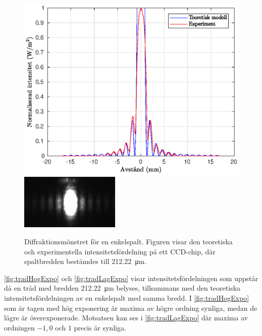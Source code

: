 \documentclass[a4paper]{article}
\begin{document}
\begin{figure}[h!]
	\centering
	\includegraphics[width=0.75\linewidth]{Data/Figurer/enkelspalt.eps}
	\includegraphics[width=0.5\linewidth]{Data/Figurer/enkelspalt.png}
	\caption{Diffraktionsmönstret för en enkelspalt. Figuren visar den teoretiska och experimentella intensitetsfördelning på ett CCD-chip, där spaltbredden bestämdes till \SI{212.22}{\micro\m}.}
	\label{fig:enkelspalt}
\end{figure}

\FloatBarrier

\autoref{fig:tradHogExpo} och \autoref{fig:tradLagExpo} visar intensitetsfördelningen som uppstår då en tråd med bredden \SI{212.22}{\micro\m} belyses, tillsammans med den teoretiska intensitetsfördelningen av en enkelspalt med samma bredd. I \autoref{fig:tradHogExpo} som är tagen med hög exponering är maxima av högre ordning synliga, medan de lägre är överexponerade. Motsatsen kan ses i \autoref{fig:tradLagExpo} där maxima av ordningen $-1, 0$ och $1$ precis är synliga.

\FloatBarrier
\end{document}
